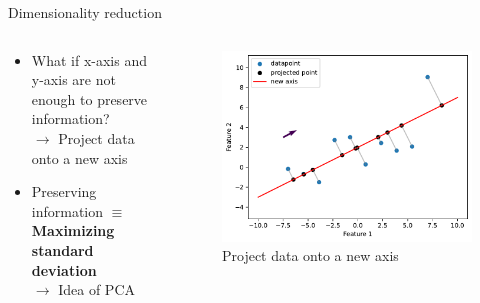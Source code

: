 \begin{frame}{Dimensionality reduction}
    \begin{columns}
        \begin{column}{0.6\textwidth}
            \begin{itemize}
                \item What if x-axis and y-axis are not enough to preserve information?\\$\rightarrow$ Project data onto a new axis
                \item Preserving information $\equiv$ \textbf{Maximizing standard deviation}\\$\rightarrow$ Idea of PCA
            \end{itemize}
        \end{column}

        \begin{column}{0.5\textwidth}
            \begin{figure}
                \centering
                \includegraphics[width=\linewidth]{img/dp1.pdf}
                \caption{Project data onto a new axis}
                \label{fig:enter-label}
            \end{figure}
        \end{column}
    \end{columns}
\end{frame}
